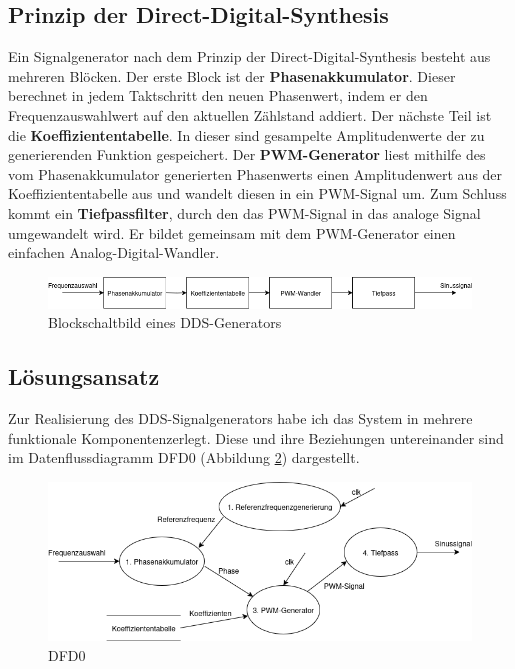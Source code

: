 \subsection{Prinzip der Direct-Digital-Synthesis}
Ein Signalgenerator nach dem Prinzip der Direct-Digital-Synthesis besteht aus mehreren Blöcken.
Der erste Block ist der \textbf{Phasenakkumulator}. Dieser berechnet in jedem Taktschritt den neuen Phasenwert,
indem er den Frequenzauswahlwert auf den aktuellen Zählstand addiert.
Der nächste Teil ist die \textbf{Koeffiziententabelle}. In dieser sind gesampelte Amplitudenwerte der zu 
generierenden Funktion gespeichert.
Der \textbf{PWM-Generator} liest mithilfe des vom Phasenakkumulator generierten
Phasenwerts einen Amplitudenwert aus der Koeffiziententabelle aus und wandelt diesen in ein PWM-Signal um.
Zum Schluss kommt ein \textbf{Tiefpassfilter}, durch den das PWM-Signal in das analoge Signal umgewandelt wird.
Er bildet gemeinsam mit dem PWM-Generator einen einfachen Analog-Digital-Wandler.

\begin{figure}[htbp]
    \centering
    \includegraphics[width=\linewidth]{img/blockschaltbild.png}
    \caption{Blockschaltbild eines DDS-Generators}
    \label{img:blockschaltbild}
\end{figure}

\subsection{Lösungsansatz}
Zur Realisierung des DDS-Signalgenerators habe ich das System in mehrere funktionale Komponentenzerlegt.
Diese und ihre Beziehungen untereinander sind im Datenflussdiagramm DFD0 (Abbildung \ref{img:dfd0}) dargestellt.

\begin{figure}[htbp]
    \centering
    \includegraphics[width=\linewidth]{img/dfd.png}
    \caption{DFD0}
    \label{img:dfd0}
\end{figure}

